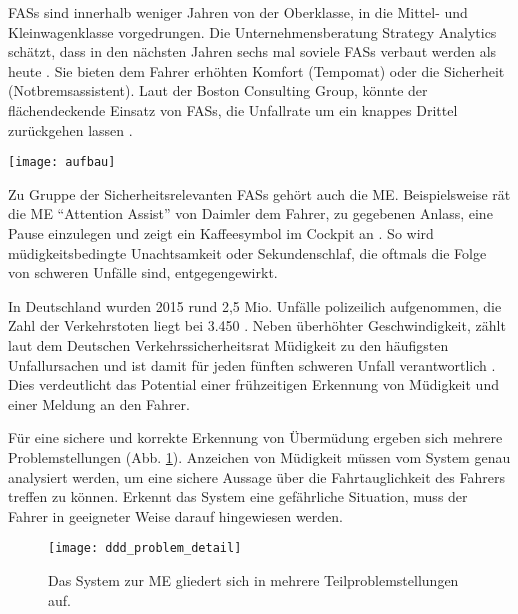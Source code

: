 \label{chap:intro}

\acl{FASs} sind innerhalb weniger Jahren von der Oberklasse, in die Mittel-  und Kleinwagenklasse vorgedrungen. Die Unternehmensberatung Strategy Analytics schätzt, dass in den nächsten Jahren sechs mal soviele \acl{FASs} verbaut werden als heute \cite{strategy_analytics}. Sie bieten dem Fahrer erhöhten Komfort (Tempomat) oder die Sicherheit (Notbremsassistent). Laut der Boston Consulting Group, könnte der flächendeckende Einsatz von \acl{FASs}, die Unfallrate um ein knappes Drittel zurückgehen lassen \cite{bcgperspectives}. 

\begin{figure*} 
  \begin{center}
    \texttt{[image: aufbau]}
    \caption[Skizze des Systemaufbaus]{Skizze des Systemaufbaus: \acl{BS} (Elektroenzephalografie / Elektrokardiogramm) liefert Daten an die Applikation und ein Feedback-Device warnt den müden Fahrer. Bild zeigt den Fahrsimulator der \acl{RTU}. \label{fig:sketch}}
  \end{center}
\end{figure*}

Zu Gruppe der Sicherheitsrelevanten \acl{FASs} gehört auch die \acl{ME}. Beispielsweise rät die \acl{ME} "`Attention Assist"' von Daimler dem Fahrer, zu gegebenen Anlass, eine Pause einzulegen und zeigt ein Kaffeesymbol im Cockpit an \cite{Daimler}. So wird müdigkeitsbedingte Unachtsamkeit oder Sekundenschlaf, die oftmals die Folge von schweren Unfälle sind, entgegengewirkt.

In Deutschland wurden 2015 rund 2,5 Mio. Unfälle polizeilich aufgenommen, die Zahl der Verkehrstoten liegt bei 3.450 \cite{accident_statistic}. Neben überhöhter Geschwindigkeit, zählt laut dem Deutschen Verkehrssicherheitsrat Müdigkeit zu den häufigsten Unfallursachen und ist damit für jeden fünften schweren Unfall verantwortlich \cite{dvr_statistic}. Dies verdeutlicht das Potential einer frühzeitigen Erkennung von Müdigkeit und einer Meldung an den Fahrer.

Für eine sichere und korrekte Erkennung von Übermüdung ergeben sich mehrere Problemstellungen (Abb. \ref{fig:ddd_problem}). Anzeichen von Müdigkeit müssen vom System genau analysiert werden, um eine sichere Aussage über die Fahrtauglichkeit des Fahrers treffen zu können. Erkennt das System eine gefährliche Situation, muss der Fahrer in geeigneter Weise darauf hingewiesen werden.

\begin{figure}[h] 
  \begin{center}
    \texttt{[image: ddd\_problem\_detail]}
    \caption[Problemstellung der Müdigkeitserkennung]{Das System zur \acl{ME} gliedert sich in mehrere Teilproblemstellungen auf.\label{fig:ddd_problem}}
  \end{center}
\end{figure}

